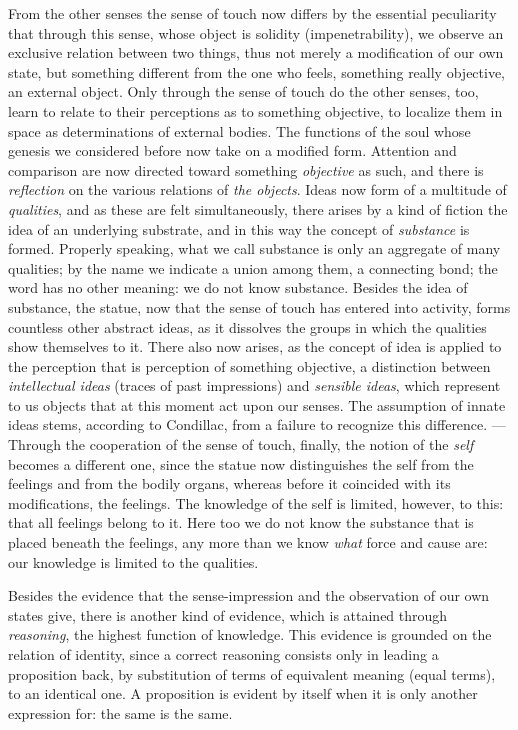 From the other senses the sense of touch now differs by the essential
peculiarity that through this sense, whose object is solidity
(impenetrability), we observe an exclusive relation between two things,
thus not merely a modification of our own state, but something
different from the one who feels, something really objective, an
external object. Only through the sense of touch do the other senses,
too, learn to relate to their perceptions as to something objective, to
localize them in space as determinations of external bodies. The
functions of the soul whose genesis we considered before now take on a
modified form. Attention and comparison are now directed toward
something \emph{objective} as such, and there is \emph{reflection} on
the various relations of \emph{the objects}. Ideas now form of a
multitude of \emph{qualities}, and as these are felt simultaneously,
there arises by a kind of fiction the idea of an underlying substrate,
and in this way the concept of \emph{substance} is formed. Properly
speaking, what we call substance is only an aggregate of many
qualities; by the name we indicate a union among them, a connecting
bond; the word has no other meaning: we do not know substance. Besides
the idea of substance, the statue, now that the sense of touch has
entered into activity, forms countless other abstract ideas, as it
dissolves the groups in which the qualities show themselves to it.
There also now arises, as the concept of idea is applied to the
perception that is perception of something objective, a distinction
between \emph{intellectual ideas} (traces of past impressions)
and \emph{sensible ideas}, which represent to us objects that at this
moment act upon our senses. The assumption of innate ideas stems,
according to Condillac, from a failure to recognize this difference.
--- Through the cooperation of the sense of touch, finally, the notion
of the \emph{self} becomes a different one, since the statue now
distinguishes the self from the feelings and from the bodily organs,
whereas before it coincided with its modifications, the feelings. The
knowledge of the self is limited, however, to this: that all feelings
belong to it. Here too we do not know the substance that is placed
beneath the feelings, any more than we know \emph{what} force and cause
are: our knowledge is limited to the qualities.

Besides the evidence that the sense-impression and the observation of
our own states give, there is another kind of evidence, which is
attained through \emph{reasoning}, the highest function of knowledge.
This evidence is grounded on the relation of identity, since a correct
reasoning consists only in leading a proposition back, by substitution
of terms of equivalent meaning (equal terms), to an identical one. A
proposition is evident by itself when it is only another expression
for: the same is the same.

